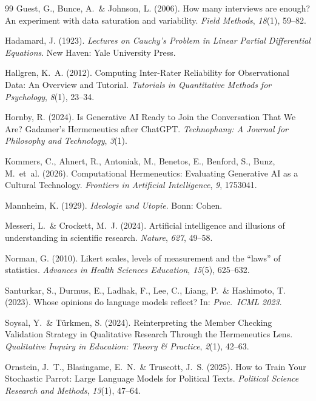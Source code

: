 \documentclass[11pt,a4paper]{article}
\begin{document}
\begin{thebibliography}{99}
  Guest, G., Bunce, A.~\& Johnson, L. (2006).
  How many interviews are enough? An experiment with data saturation and variability.
  \textit{Field Methods}, \textit{18}(1), 59--82.

  Hadamard, J. (1923).
  \textit{Lectures on Cauchy's Problem in Linear Partial Differential Equations}.
  New Haven: Yale University Press.

  Hallgren, K.~A. (2012).
  Computing Inter-Rater Reliability for Observational Data: An Overview and Tutorial.
  \textit{Tutorials in Quantitative Methods for Psychology}, \textit{8}(1), 23--34.

  Hornby, R. (2024).
  Is Generative AI Ready to Join the Conversation That We Are? Gadamer's Hermeneutics after ChatGPT.
  \textit{Technophany: A Journal for Philosophy and Technology}, \textit{3}(1).

  Kommers, C., Ahnert, R., Antoniak, M., Benetos, E., Benford, S., Bunz, M.~et~al. (2026).
  Computational Hermeneutics: Evaluating Generative AI as a Cultural Technology.
  \textit{Frontiers in Artificial Intelligence}, \textit{9}, 1753041.

  Mannheim, K. (1929).
  \textit{Ideologie und Utopie}.
  Bonn: Cohen.

  Messeri, L.~\& Crockett, M.~J. (2024).
  Artificial intelligence and illusions of understanding in scientific research.
  \textit{Nature}, \textit{627}, 49--58.

  Norman, G. (2010).
  Likert scales, levels of measurement and the ``laws'' of statistics.
  \textit{Advances in Health Sciences Education}, \textit{15}(5), 625--632.

  Santurkar, S., Durmus, E., Ladhak, F., Lee, C., Liang, P.~\& Hashimoto, T. (2023).
  Whose opinions do language models reflect?
  In: \textit{Proc.\ ICML 2023}.

  Soysal, Y.~\& T\"urkmen, S. (2024).
  Reinterpreting the Member Checking Validation Strategy in Qualitative Research Through the Hermeneutics Lens.
  \textit{Qualitative Inquiry in Education: Theory \& Practice}, \textit{2}(1), 42--63.

  Ornstein, J.~T., Blasingame, E.~N.~\& Truscott, J.~S. (2025).
  How to Train Your Stochastic Parrot: Large Language Models for Political Texts.
  \textit{Political Science Research and Methods}, \textit{13}(1), 47--64.


\end{thebibliography}
\end{document}
